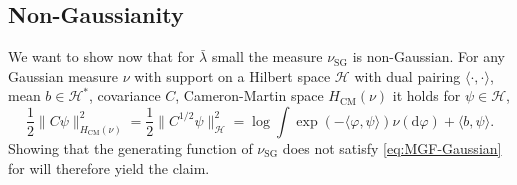 \documentclass[11pt, a4paper]{scrartcl}
\numberwithin{equation}{section}
\theoremstyle{plain}
\theoremstyle{remark}
\newcommand{\mathd}{\mathrm{d}}
\newcommand{\tmop}[1]{\ensuremath{\operatorname{#1}}}
\begin{document}
\subsection{Non-Gaussianity}\label{sec:non-Gaussian}

We want to show now that for $\bar{\lambda}$ small the measure $\nu_{\tmop{SG}}$ is
non-Gaussian. For any Gaussian measure $\nu$ with support on a Hilbert space
$\mathcal{H}$ with dual pairing $\langle\cdot,\cdot\rangle$, mean $b \in \mathcal{H}^\ast$, covariance $C$, Cameron-Martin space
$H_{\tmop{CM}}(\nu)$ it holds for $\psi\in \mathcal{H}$,
\begin{equation}
  \frac{1}{2}\|C \psi\|_{H_{\tmop{CM}}(\nu)}^2=\frac{1}{2} \|C^{1/2} \psi\|^2_{\mathcal{H}} = \log\int \exp(-\langle \varphi,\psi\rangle)
  \nu(\mathd \varphi) + \langle b,\psi \rangle.\label{eq:MGF-Gaussian}
\end{equation}
Showing that the generating function of $\nu_{\tmop{SG}}$ does not satisfy
 \eqref{eq:MGF-Gaussian} for will therefore yield the claim. 
\end{document}
